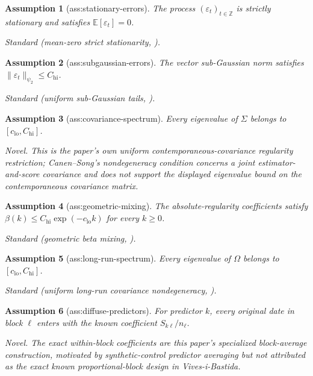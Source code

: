 \documentclass{article}
\newtheorem{assumption}{Assumption}
\begin{document}
\begin{assumption}[ass:stationary-errors]\label{ass:stationary-errors}
The process \((\varepsilon_t)_{t\in\mathbb Z}\) is strictly stationary and satisfies \(\mathbb E[\varepsilon_t]=0\).
\par\smallskip\noindent\emph{Standard} (mean-zero strict stationarity, \cite{Fry2024MomentsSC}).
\end{assumption}

\begin{assumption}[ass:subgaussian-errors]\label{ass:subgaussian-errors}
The vector sub-Gaussian norm satisfies \(\lVert\varepsilon_t\rVert_{\psi_2}\le C_{\mathrm{hi}}\).
\par\smallskip\noindent\emph{Standard} (uniform sub-Gaussian tails, \cite{CattaneoFengTitiunik2021PredictionIntervals}).
\end{assumption}

\begin{assumption}[ass:covariance-spectrum]\label{ass:covariance-spectrum}
Every eigenvalue of \(\Sigma\) belongs to \([c_{\mathrm{lo}},C_{\mathrm{hi}}]\).
\par\smallskip\noindent\emph{Novel.} This is the paper's own uniform contemporaneous-covariance regularity restriction; Canen--Song's nondegeneracy condition concerns a joint estimator-and-score covariance and does not support the displayed eigenvalue bound on the contemporaneous covariance matrix.
\end{assumption}

\begin{assumption}[ass:geometric-mixing]\label{ass:geometric-mixing}
The absolute-regularity coefficients satisfy \(\beta(k)\le C_{\mathrm{hi}}\exp(-c_{\mathrm{lo}}k)\) for every \(k\ge0\).
\par\smallskip\noindent\emph{Standard} (geometric beta mixing, \cite{CattaneoFengTitiunik2021PredictionIntervals}).
\end{assumption}

\begin{assumption}[ass:long-run-spectrum]\label{ass:long-run-spectrum}
Every eigenvalue of \(\Omega\) belongs to \([c_{\mathrm{lo}},C_{\mathrm{hi}}]\).
\par\smallskip\noindent\emph{Standard} (uniform long-run covariance nondegeneracy, \cite{Fry2024MomentsSC}).
\end{assumption}

\begin{assumption}[ass:diffuse-predictors]\label{ass:diffuse-predictors}
For predictor \(k\), every original date in block \(\ell\) enters with the known coefficient \(S_{k\ell}/n_\ell\).
\par\smallskip\noindent\emph{Novel.} The exact within-block coefficients are this paper's specialized block-average construction, motivated by synthetic-control predictor averaging but not attributed as the exact known proportional-block design in Vives-i-Bastida.
\end{assumption}
\end{document}
